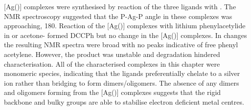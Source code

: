 [Ag(\tBuxantphos)] complexes were synthesised by reaction of the three \tBuxantphos{} ligands with .  The NMR spectroscopy suggested that the P-Ag-P angle in these complexes was approaching, 180\degrees{}.  Reaction of the [Ag(\tBuxantphos)] complexes with lithium phenylacetylide in  or acetone- formed DCCPh but no change in the [Ag(\tBuxantphos)] complexes.  In  changes the resulting NMR spectra were broad with no peaks indicative of free phenyl acetylene.  However, the product was unstable and degradation hindered characterisation.  All of the characterised complexes in this chapter were monomeric species, indicating that the \tBuxantphos{} ligands preferentially chelate to a silver ion rather than bridging to form dimers/oligomers.  The absence of any dimers and oligomers forming from the [Ag(\tBuxantphos)] complexes suggests that the rigid backbone and bulky \tBu{} groups are able to stabilise electron deficient metal centres.  

 





